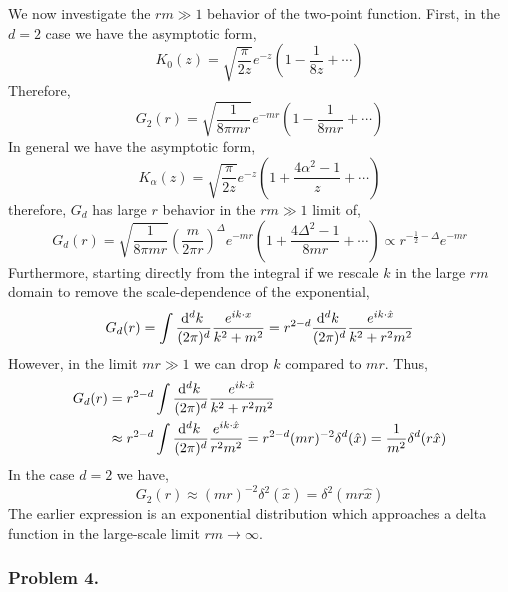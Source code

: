 \documentclass[12pt]{article}
\begin{document}
We now investigate the $rm \gg 1$ behavior of the two-point function. First, in the $d = 2$ case we have the asymptotic form,
\[ K_0(z) = \sqrt{\frac{\pi}{2 z}} e^{-z} \left( 1  - \frac{1}{8 z} + \cdots \right) \]
Therefore,
\[ G_2(r) = \sqrt{\frac{1}{8 \pi mr}} e^{-mr} \left( 1  - \frac{1}{8 mr} + \cdots \right) \]
In general we have the asymptotic form,
\[ K_{\alpha}(z) = \sqrt{\frac{\pi}{2 z}} e^{-z} \left(1 + \frac{4 \alpha^2 - 1}{z} + \cdots \right) \]
therefore, $G_d$ has large $r$ behavior in the $rm \gg 1$ limit of,
\[ G_d(r) = \sqrt{\frac{1}{8 \pi m r}} \left( \frac{m}{2 \pi r} \right)^{\Delta} e^{-mr} \left( 1 + \frac{4 \Delta^2 - 1}{8 m r} + \cdots \right) \propto r^{-\frac{1}{2} - \Delta} e^{-mr} \]
Furthermore, starting directly from the integral if we rescale $k$ in the large $r m$ domain to remove the scale-dependence of the exponential, 
\[ G_d(r) = \int \frac{\mathrm{d}^{d} k \:}{(2\pi)^d} \frac{e^{i k \cdot x}}{k^2 + m^2} = r^{2 - d} \frac{\mathrm{d}^{d} k \:}{(2 \pi)^d} \frac{e^{i k \cdot \hat{x}}}{k^2 + r^2 m^2} \]
However, in the limit $mr \gg 1$ we can drop $k$ compared to $mr$. Thus,
\begin{align*}
 G_d(r) & = r^{2 - d} \int \frac{\mathrm{d}^{d} k \:}{(2 \pi)^d} \frac{e^{i k \cdot \hat{x}}}{k^2 + r^2 m^2}
\\
& \approx r^{2 - d} \int \frac{\mathrm{d}^{d} k \:}{(2 \pi)^d} \frac{e^{i k \cdot \hat{x}}}{r^2 m^2} = r^{2 - d} (mr)^{-2} \delta^d(\hat{x}) = \frac{1}{m^2} \delta^d(r \hat{x})
\end{align*}
In the case $d = 2$ we have,
\[ G_2(r) \approx (m r)^{-2} \delta^2(\hat{x}) = \delta^2(mr \hat{x}) \]
The earlier expression is an exponential distribution which approaches a delta function in the large-scale limit $rm \to \infty$. 

\subsubsection{Problem 4.}
\end{document}
